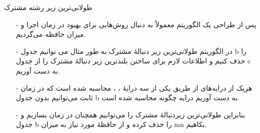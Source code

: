 \begin{frame}{‌طولانی‌ترین زیر رشته مشترک}
\begin{itemize}\itemr
\item[-]
پس از طراحی یک الگوریتم معمولاً به دنبال روش‌هایی برای بهبود در زمان اجرا و میزان حافظه می‌گردیم.
\item[-]
در الگوریتم طولانی‌ترین زیر دنبالهٔ مشترک به طور مثال می توانیم جدول b را حذف کنیم و اطلاعات لازم برای ساختن بلندترین زیر دنبالهٔ مشترک را از جدول c به دست آوریم.
\item[-]
هریک از درایه‌های
از طریق یکی از سه درایهٔ
،
،
محاسبه شده است که در زمان ثابت می‌توانیم بدون جدول b به دست آوریم درایه
چگونه محاسبه شده است.
\item[-]
بنابراین طولانی‌ترین زیردنبالهٔ مشترک را می‌توانیم همچنان در زمان
بسازیم و جدول b را حذف کرده و از حافظهٔ مورد نیاز به میزان
mn
بکاهیم.
\end{itemize}
\end{frame}
